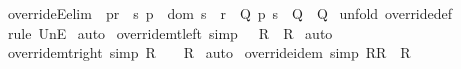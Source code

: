 \begin{isabellebody}
\isanewline
{}\isamarkupfalse%
\ overrideE{\isacharbrackleft}elim{\isacharbang}{\isacharbrackright}{\isacharcolon}\ {\isachardoublequoteopen}{\isasymlbrakk}\ p{\isacharcolon}{\isacharparenleft}r\ {\isacharparenleft}{\isacharplus}{\isacharparenright}\ s{\isacharparenright}{\isacharsemicolon}\ p\ {\isacharcolon}\ {\isacharparenleft}dom\ s{\isacharparenright}\ {\isacharless}{\isacharminus}{\isacharcolon}\ r\ {\isasymLongrightarrow}\ Q{\isacharsemicolon}\ p{\isacharcolon}\ s\ {\isasymLongrightarrow}\ Q{\isasymrbrakk}\ {\isasymLongrightarrow}\ Q{\isachardoublequoteclose}\isanewline
%
\isadelimproof
%
\endisadelimproof
%
\isatagproof
{}\isamarkupfalse%
\ {\isacharparenleft}unfold\ override{\isacharunderscore}def{\isacharparenright}\isanewline
{}\isamarkupfalse%
\ {\isacharparenleft}rule\ UnE{\isacharparenright}\isanewline
{}\isamarkupfalse%
\ {\isacharparenleft}auto{\isacharparenright}\isanewline
{}\isamarkupfalse%
%
\endisatagproof
{\isafoldproof}%
%
\isadelimproof
\isanewline
%
\endisadelimproof
\isanewline
{}\isamarkupfalse%
\ override{\isacharunderscore}mt{\isacharunderscore}left\ {\isacharbrackleft}simp{\isacharbrackright}{\isacharcolon}\ {\isachardoublequoteopen}{\isacharparenleft}{\isacharbraceleft}{\isacharbraceright}\ {\isacharparenleft}{\isacharplus}{\isacharparenright}\ R{\isacharparenright}\ {\isacharequal}\ R{\isachardoublequoteclose}\isanewline
%
\isadelimproof
%
\endisadelimproof
%
\isatagproof
{}\isamarkupfalse%
\ auto\isanewline
{}\isamarkupfalse%
%
\endisatagproof
{\isafoldproof}%
%
\isadelimproof
\isanewline
%
\endisadelimproof
\isanewline
{}\isamarkupfalse%
\ override{\isacharunderscore}mt{\isacharunderscore}right\ {\isacharbrackleft}simp{\isacharbrackright}{\isacharcolon}\ {\isachardoublequoteopen}{\isacharparenleft}R\ {\isacharparenleft}{\isacharplus}{\isacharparenright}\ {\isacharbraceleft}{\isacharbraceright}{\isacharparenright}\ {\isacharequal}\ R{\isachardoublequoteclose}\isanewline
%
\isadelimproof
%
\endisadelimproof
%
\isatagproof
{}\isamarkupfalse%
\ auto\isanewline
{}\isamarkupfalse%
%
\endisatagproof
{\isafoldproof}%
%
\isadelimproof
\isanewline
%
\endisadelimproof
\isanewline
\isanewline
{}\isamarkupfalse%
\ override{\isacharunderscore}idem\ {\isacharbrackleft}simp{\isacharbrackright}{\isacharcolon}\ {\isachardoublequoteopen}{\isacharparenleft}R{\isacharparenleft}{\isacharplus}{\isacharparenright}R{\isacharparenright}\ {\isacharequal}\ R{\isachardoublequoteclose}\isanewline

\end{isabellebody}
